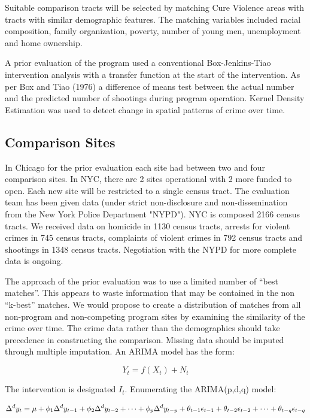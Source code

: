 \documentclass[11pt]{article}
\begin{document}
Suitable comparison tracts will be selected by matching Cure Violence
areas with tracts with similar demographic features. The matching
variables included racial composition, family organization, poverty,
number of young men, unemployment and home ownership.

A prior evaluation of the program used a conventional Box-Jenkins-Tiao
intervention analysis with a transfer function at the start of the
intervention.  As per Box and Tiao (1976) a difference of means test
between the actual number and the predicted number of shootings during
program operation.  Kernel Density Estimation was used to detect
change in spatial patterns of crime over time.

\subsection{Comparison Sites}
\label{sec-3-1}

In Chicago for the prior evaluation each site had between two and four
comparison sites. In NYC, there are 2 sites operational with 2 more
funded to open.  Each new site will be restricted to a single census
tract. The evaluation team has been given data (under strict
non-disclosure and non-dissemination from the New York Police
Department "NYPD").  NYC is composed 2166 census tracts.  We received
data on homicide in 1130 census tracts, arrests for violent crimes in
745 census tracts, complaints of violent crimes in 792 census tracts
and shootings in 1348 census tracts. Negotiation with the NYPD for
more complete data is ongoing.

The approach of the prior evaluation was to use a limited number of
``best matches''.  This appears to waste information that may be
contained in the non ``k-best'' matches.  We would propose to create a
distribution of matches from all non-program and non-competing program
sites by examining the similarity of the crime over time.  The crime
data rather than the demographics should take precedence in
constructing the comparison.  Missing data should be imputed through
multiple imputation.  An ARIMA model has the form:

\begin{equation}
Y_t=f(X_t)+N_t
\end{equation}

The intervention is designated \( I_t \).  Enumerating the ARIMA(p,d,q) model:

\begin{equation}
\Delta^d y_t = \mu + \phi_1 \Delta^d y_{t-1} + \phi_2 \Delta^d y_{t-2} + \cdots + \phi_p \Delta^d y_{t-p} + \\
\theta_{t-1} \epsilon_{t-1} + \theta_{t-2} \epsilon_{t-2} + \cdots + \theta_{t-q} \epsilon_{t-q}
\end{equation}
\end{document}
